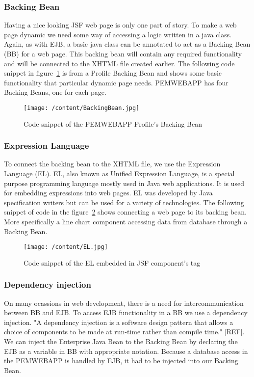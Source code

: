 \documentclass[12pt, a4paper]{report}   %
\begin{document}
\begin{enumerate}
\subsubsection{Backing Bean}
Having a nice looking JSF web page is only one part of story. To make a web page dynamic we need some way of accessing a logic written in a java class. Again, as with EJB, a basic java class can be annotated to act as a Backing Bean (BB) for a web page. This backing bean will contain any required functionality and will be connected to the XHTML file created earlier. The following code snippet in figure~\ref{BackingBean} is from a Profile Backing Bean and shows some basic functionality that particular dynamic page needs. PEMWEBAPP has four Backing Beans, one for each page.


\begin{figure}[H]
  \centering
	\texttt{[image: /content/BackingBean.jpg]}
	  \caption{Code snippet of the PEMWEBAPP Profile's Backing Bean}
	  \label{BackingBean}
\end{figure}


\subsubsection{Expression Language}
To connect the backing bean to the XHTML file, we use the Expression Language (EL). EL, also known as Unified Expression Language, is a special purpose programming language mostly used in Java web applications. It is used for embedding expressions into web pages. EL was developed by Java specification writers but can be used for a variety of technologies. The following snippet of code in the figure~\ref{EL} shows connecting a web page to its backing bean. More specifically a line chart component accessing data from database through a Backing Bean.


\begin{figure}[H]
  \centering
	\texttt{[image: /content/EL.jpg]}
	  \caption{Code snippet of the EL embedded in JSF component's tag}
	  \label{EL}
\end{figure}


\subsubsection{Dependency injection}
On many ocassions in web development, there is a need for intercommunication between BB and EJB. To access EJB functionality in a BB we use a dependency injection. "A dependency injection is a software design pattern that allows a choice of components to be made at run-time rather than compile time." [REF]. We can inject the Enterprise Java Bean to the Backing Bean by declaring the EJB as a variable in BB with appropriate notation. Because a database access in the PEMWEBAPP is handled by EJB, it had to be injected into our Backing Bean.



\end{enumerate}
\end{document}
